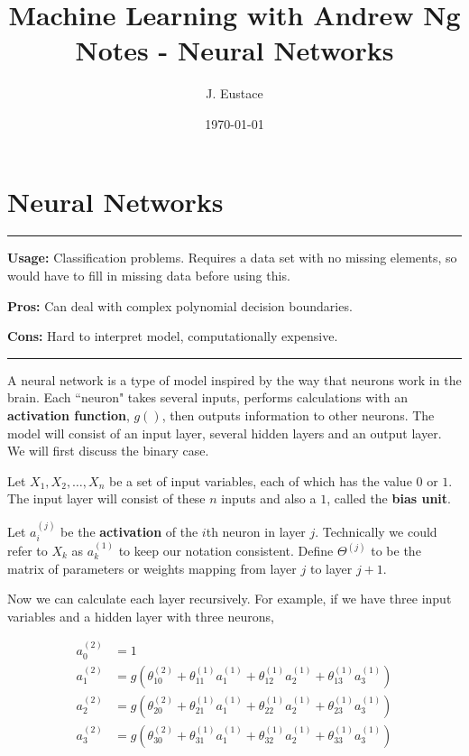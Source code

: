 \documentclass{article}
\begin{document}
\title{Machine Learning with Andrew Ng Notes - Neural Networks}
\author{J. Eustace}
\date{\today}
\maketitle

\section{Neural Networks}


\noindent\rule[0.5ex]{\linewidth}{1pt}

\textbf{Usage:} Classification problems. Requires a data set with no missing elements, so would have to fill in missing data before using this.

\textbf{Pros:} Can deal with complex polynomial decision boundaries.

\textbf{Cons:} Hard to interpret model, computationally expensive.

\noindent\rule[0.5ex]{\linewidth}{1pt}


A neural network is a type of model inspired by the way that neurons work in the brain. Each ``neuron" takes several inputs, performs calculations with an \textbf{activation function}, $g()$, then outputs information to other neurons. The model will consist of an input layer, several hidden layers and an output layer. We will first discuss the binary case.

Let $X_1, X_2, \dots, X_n$ be a set of input variables, each of which has the value $0$ or $1$. The input layer will consist of these $n$ inputs and also a $1$, called the \textbf{bias unit}. 

Let $a_i^{(j)}$ be the \textbf{activation} of the $i$th neuron in layer $j$. Technically we could refer to $X_k$ as $a_k^{(1)}$ to keep our notation consistent. Define $\Theta^{(j)}$ to be the matrix of parameters or weights mapping from layer $j$ to layer $j+1$. 


Now we can calculate each layer recursively. For example, if we have three input variables and a hidden layer with three neurons, 

\begin{align}
a_0^{(2)} & = 1 \nonumber \\ 
a_1^{(2)} & = g(\theta_{10}^{(2)} + \theta_{11}^{(1)}a_1^{(1)} + \theta_{12}^{(1)}a_2^{(1)} + \theta_{13}^{(1)}a_3^{(1)}) \nonumber \\ 
a_2^{(2)} & = g(\theta_{20}^{(2)} + \theta_{21}^{(1)}a_1^{(1)} + \theta_{22}^{(1)}a_2^{(1)} + \theta_{23}^{(1)}a_3^{(1)}) \nonumber \\ 
a_3^{(2)} & = g(\theta_{30}^{(2)} + \theta_{31}^{(1)}a_1^{(1)} + \theta_{32}^{(1)}a_2^{(1)} + \theta_{33}^{(1)}a_3^{(1)}) \nonumber 
\end{align}
\end{document}
